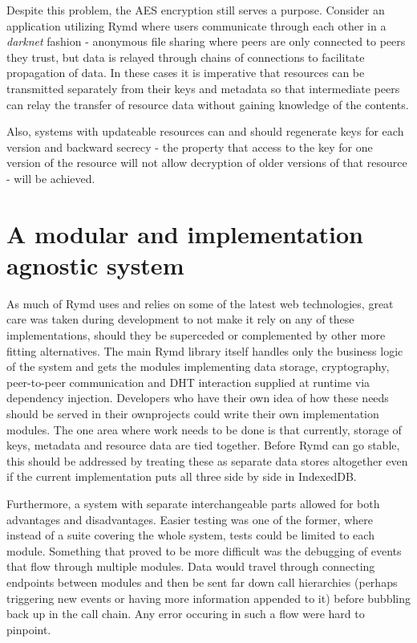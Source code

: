 Despite this problem, the AES encryption still serves a purpose. Consider an application utilizing Rymd where users communicate through each other in a \emph{darknet} fashion - anonymous file sharing where peers are only connected to peers they trust, but data is relayed through chains of connections to facilitate propagation of data. In these cases it is imperative that resources can be transmitted separately from their keys and metadata so that intermediate peers can relay the transfer of resource data without gaining knowledge of the contents.

Also, systems with updateable resources can and should regenerate keys for each version and backward secrecy - the property that access to the key for one version of the resource will not allow decryption of older versions of that resource - will be achieved.

\section{A modular and implementation agnostic system}
As much of Rymd uses and relies on some of the latest web technologies, great care was taken during development to not make it rely on any of these implementations, should they be superceded or complemented by other more fitting alternatives. The main Rymd library itself handles only the business logic of the system and gets the modules implementing data storage, cryptography, peer-to-peer communication and DHT interaction supplied at runtime via dependency injection. Developers who have their own idea of how these needs should be served in their ownprojects could write their own implementation modules. The one area where work needs to be done is that currently, storage of keys, metadata and resource data are tied together. Before Rymd can go stable, this should be addressed by treating these as separate data stores altogether even if the current implementation puts all three side by side in IndexedDB.

Furthermore, a system with separate interchangeable parts allowed for both advantages and disadvantages. Easier testing was one of the former, where instead of a suite covering the whole system, tests could be limited to each module. Something that proved to be more difficult was the debugging of events that flow through multiple modules. Data would travel through connecting endpoints between modules and then be sent far down call hierarchies (perhaps triggering new events or having more information appended to it) before bubbling back up in the call chain. Any error occuring in such a flow were hard to pinpoint.

